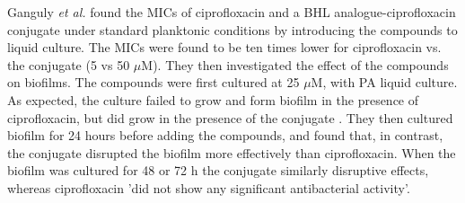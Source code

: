 Ganguly \textit{et al.} \cite{Ganguly2011} found the MICs of ciprofloxacin and a BHL analogue-ciprofloxacin conjugate  under standard planktonic conditions by introducing the compounds to liquid culture. The MICs were found to be ten times lower for ciprofloxacin vs. the conjugate  (5 vs 50 $\mu$M). They then investigated the effect of the compounds on biofilms. The compounds were first cultured at 25 $\mu$M, with PA liquid culture. As expected, the culture failed to grow and form biofilm in the presence of ciprofloxacin, but did grow in the presence of the conjugate . They then cultured biofilm for 24 hours before adding the compounds, and found that, in contrast, the conjugate  disrupted the biofilm more effectively than ciprofloxacin. When the biofilm was cultured for 48 or 72 h the conjugate similarly disruptive effects, whereas ciprofloxacin 'did not show any significant antibacterial activity'.
